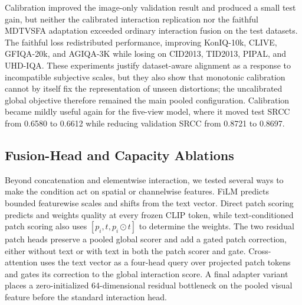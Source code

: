 \documentclass{article}
\begin{document}
Calibration improved the image-only validation result and produced a small test gain, but neither the calibrated interaction replication nor the faithful MDTVSFA adaptation exceeded ordinary interaction fusion on the test datasets. The faithful loss redistributed performance, improving KonIQ-10k, CLIVE, GFIQA-20k, and AGIQA-3K while losing on CID2013, TID2013, PIPAL, and UHD-IQA. These experiments justify dataset-aware alignment as a response to incompatible subjective scales, but they also show that monotonic calibration cannot by itself fix the representation of unseen distortions; the uncalibrated global objective therefore remained the main pooled configuration. Calibration became mildly useful again for the five-view model, where it moved test SRCC from 0.6580 to 0.6612 while reducing validation SRCC from 0.8721 to 0.8697.

\subsection{Fusion-Head and Capacity Ablations}

Beyond concatenation and elementwise interaction, we tested several ways to make the condition act on spatial or channelwise features. FiLM predicts bounded featurewise scales and shifts from the text vector. Direct patch scoring predicts and weights quality at every frozen CLIP token, while text-conditioned patch scoring also uses $[p_i,t,p_i\odot t]$ to determine the weights. The two residual patch heads preserve a pooled global scorer and add a gated patch correction, either without text or with text in both the patch scorer and gate. Cross-attention uses the text vector as a four-head query over projected patch tokens and gates its correction to the global interaction score. A final adapter variant places a zero-initialized 64-dimensional residual bottleneck on the pooled visual feature before the standard interaction head.
\end{document}
